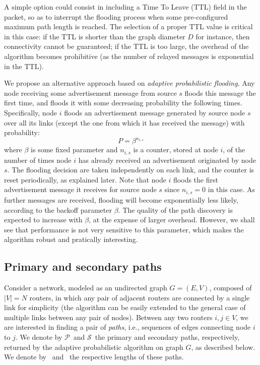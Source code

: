 \documentclass[conference]{IEEEtran}
\newcommand{\N}{N}
\newcommand{\PA}{\ensuremath{\mathcal{P}}}
\newcommand{\SE}{\ensuremath{\mathcal{S}}}
\begin{document}
A simple option could consist in including a Time To Leave (TTL) field in the packet, so as to   interrupt the flooding process when some pre-configured maximum path length is reached.  The selection of a proper TTL value is  critical in this case: if the TTL is shorter than the graph diameter $D$ for instance, then connectivity cannot be guaranteed; if the TTL is too large, the overhead of the algorithm becomes prohibitive (as the number of relayed messages is exponential in the TTL).

We propose an alternative approach based on {\it adaptive probabilistic flooding}. Any node receiving some advertisement message from source $s$ floods this message the first time, and floods it with some decreasing probability the following times. Specifically,  node $i$ floods an advertisement message generated by source node $s$ over all its links  (except the one from which  it has received the message) with probability:
\begin{equation}
  P=\beta^{n_{i,s}}
  \label{eq:p}
\end{equation}
where $\beta$ is some fixed parameter and $n_{i,s}$ is a counter, stored at node $i$, of the number of times node $i$ has already received an advertisement originated by node $s$. The flooding decision are taken independently on each link, and the counter is reset periodically, as explained later. 
Note that node  $i$ floods the first advertisement message it receives for source node $s$ since $n_{i,s} = 0$  in this case. As further messages are received, flooding will become exponentially less likely, according to the backoff parameter $\beta$. 
The quality of the path discovery is expected to increase with $\beta$, at the expense of larger overhead. 
However, we shall see that performance is not very sensitive to this parameter, which makes the algorithm robust and pratically interesting. 


\subsection{Primary and secondary paths}
Consider a network, modeled as an undirected graph $G=(E,V)$, composed of $|V|=\N$ routers, in which any pair of adjacent routers are connected by a single link for simplicity (the algorithm can be easily extended to  the general case of multiple links between any pair of nodes). Between any two routers $i,j\in V$, we are interested in finding a pair of \emph{paths}, i.e., sequences of edges 
connecting node $i$ to $j$.  We denote by  \PA\ and \SE\ the primary and secondary paths, respectively, returned by the adaptive probabilistic algorithm on graph $G$, as described below. 
We denote by \lenP\ and \lenS\ the respective lengths of these paths.
  
\end{document}
